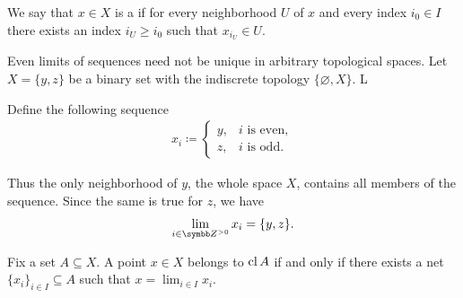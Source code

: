 \begin{definition}\label{def:net_cluster_point}\cite[50]{Engelking1989}
  We say that $x \in X$ is a  if for every neighborhood $U$ of $x$ and every index $i_0 \in I$ there exists an index $i_U \geq i_0$ such that $x_{i_U} \in U$.
\end{definition}

\begin{example}\label{ex:multiple_limit_points_of_net}
  Even limits of sequences need not be unique in arbitrary topological spaces. Let $X = \{ y, z \}$ be a binary set with the indiscrete topology $\{ \varnothing, X \}$. L

  Define the following sequence
  \begin{align*}
    x_i \coloneqq \begin{cases}
      y, &i \text{ is even}, \\
      z, &i \text{ is odd}.
    \end{cases}
  \end{align*}

  Thus the only neighborhood of $y$, the whole space $X$, contains all members of the sequence. Since the same is true for $z$, we have
  \begin{align*}
    \lim_{i \in \BB{Z}^{>0}} x_i = \{ y, z \}.
  \end{align*}
\end{example}

\begin{proposition}\label{thm:limit_point_iff_in_closure}\cite[proposition 1.6.3]{Engelking1989}
  Fix a set $A \subseteq X$. A point $x \in X$ belongs to $\operatorname{cl}{A}$ if and only if there exists a net $\{ x_i \}_{i \in I} \subseteq A$ such that $x = \lim_{i \in I} x_i$.
\end{proposition}
